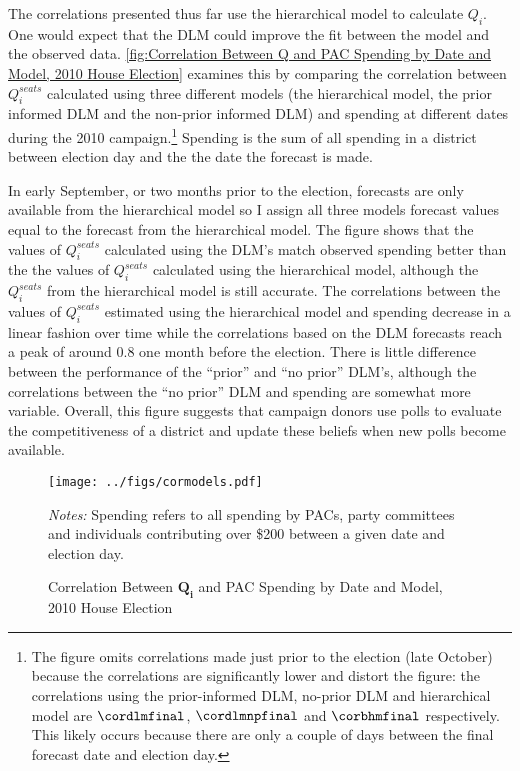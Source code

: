 \documentclass[12pt,final,fleqn]{article}
\theoremstyle{plain}
\begin{document}
The correlations presented thus far use the hierarchical model to calculate $Q_i$. One would expect that the DLM could improve the fit between the model and the observed data. \autoref{fig:Correlation Between Q and PAC Spending by Date and Model, 2010 House Election} examines this by comparing the correlation between $Q_i^{seats}$ calculated using three different models (the hierarchical model, the prior informed DLM and the non-prior informed DLM) and spending at different dates during the 2010 campaign.\footnote{The figure omits correlations made just prior to the election (late October) because the correlations are significantly lower and distort the figure: the correlations using the prior-informed DLM, no-prior DLM and hierarchical model are $\cordlmfinal$, $\cordlmnpfinal$ and $\corbhmfinal$ respectively. This likely occurs because there are only a couple of days between the final forecast date and election day.} Spending is the sum of all spending in a district between election day and the the date the forecast is made.

In early September, or two months prior to the election, forecasts are only available from the hierarchical model so I assign all three models forecast values equal to the forecast from the hierarchical model. The figure shows that the values of $Q_i^{seats}$ calculated using the DLM's match observed spending better than the the values of $Q_i^{seats}$ calculated using the hierarchical model, although the $Q_i^{seats}$ from the hierarchical model is still accurate. The correlations between the values of $Q_i^{seats}$ estimated using the hierarchical model and spending decrease in a linear fashion over time while the correlations based on the DLM forecasts reach a peak of around 0.8 one month before the election.  There is little difference between the performance of the ``prior'' and ``no prior'' DLM's, although the correlations between the ``no prior'' DLM and spending are somewhat more variable. Overall, this figure suggests that campaign donors use polls to evaluate the competitiveness of a district and update these beliefs when new polls become available.

\begin{figure}[!htb]
\texttt{[image: ../figs/cormodels.pdf]}
\vspace{.5cm}
\caption{Correlation Between $\mathbf{Q_i}$ and PAC Spending by Date and Model, 2010 House Election}
\label{fig:Correlation Between Q and PAC Spending by Date and Model, 2010 House Election}
\begin{minipage}{\linewidth}
\footnotesize
\emph{Notes:} Spending refers to all spending by PACs, party committees and individuals contributing over \$200 between a given date and election day.
\end{minipage}
\end{figure}
\end{document}
